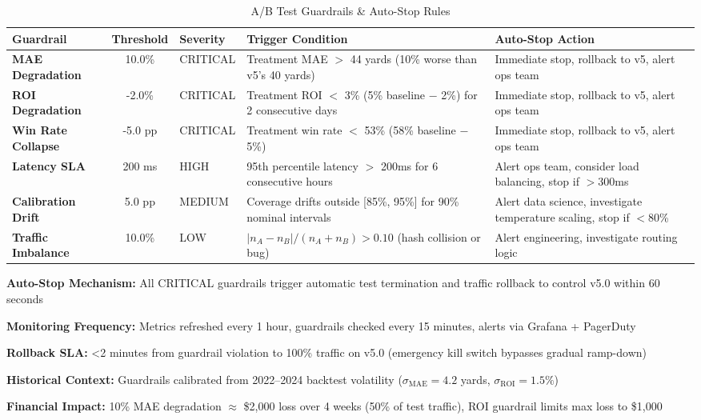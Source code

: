 \begin{table}[htbp]
\centering
\small
\caption{A/B Test Guardrails \& Auto-Stop Rules}
\label{tab:ab-guardrails}
\begin{tabular}{@{}p{2.5cm}S[table-format=2.1]lp{5.0cm}p{2.5cm}@{}}
\toprule
\textbf{Guardrail} & {\textbf{Threshold}} & \textbf{Severity} & \textbf{Trigger Condition} & \textbf{Auto-Stop Action} \\
\midrule
\textbf{MAE Degradation} & {10.0}\% & CRITICAL & Treatment MAE $>$ 44 yards (10\% worse than v5's 40 yards) & Immediate stop, rollback to v5, alert ops team \\
\addlinespace[2pt]
\textbf{ROI Degradation} & {-2.0}\% & CRITICAL & Treatment ROI $<$ 3\% (5\% baseline $-$ 2\%) for 2 consecutive days & Immediate stop, rollback to v5, alert ops team \\
\addlinespace[2pt]
\textbf{Win Rate Collapse} & {-5.0} pp & CRITICAL & Treatment win rate $<$ 53\% (58\% baseline $-$ 5\%) & Immediate stop, rollback to v5, alert ops team \\
\addlinespace[2pt]
\textbf{Latency SLA} & {200} ms & HIGH & 95th percentile latency $>$ 200ms for 6 consecutive hours & Alert ops team, consider load balancing, stop if $>$300ms \\
\addlinespace[2pt]
\textbf{Calibration Drift} & {5.0} pp & MEDIUM & Coverage drifts outside [85\%, 95\%] for 90\% nominal intervals & Alert data science, investigate temperature scaling, stop if $<$80\% \\
\addlinespace[2pt]
\textbf{Traffic Imbalance} & {10.0}\% & LOW & $|n_A - n_B| / (n_A + n_B) > 0.10$ (hash collision or bug) & Alert engineering, investigate routing logic \\
\bottomrule
\end{tabular}
\begin{tablenotes}
\item \textbf{Auto-Stop Mechanism:} All CRITICAL guardrails trigger automatic test termination and traffic rollback to control v5.0 within 60 seconds
\item \textbf{Monitoring Frequency:} Metrics refreshed every 1 hour, guardrails checked every 15 minutes, alerts via Grafana + PagerDuty
\item \textbf{Rollback SLA:} <2 minutes from guardrail violation to 100\% traffic on v5.0 (emergency kill switch bypasses gradual ramp-down)
\item \textbf{Historical Context:} Guardrails calibrated from 2022--2024 backtest volatility ($\sigma_{\text{MAE}} = 4.2$ yards, $\sigma_{\text{ROI}} = 1.5\%$)
\item \textbf{Financial Impact:} 10\% MAE degradation $\approx$ \$2,000 loss over 4 weeks (50\% of test traffic), ROI guardrail limits max loss to \$1,000
\end{tablenotes}
\end{table}

